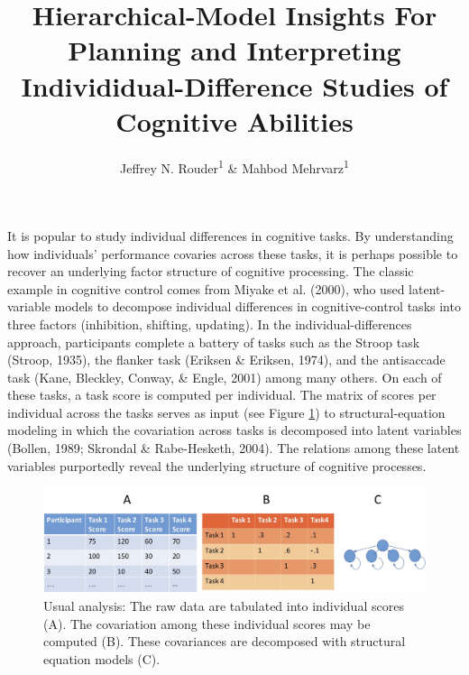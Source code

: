 \documentclass[
  ,man]{apa6}
\title{Hierarchical-Model Insights For Planning and Interpreting Individidual-Difference Studies of Cognitive Abilities}
\author{Jeffrey N. Rouder\textsuperscript{1} \& Mahbod Mehrvarz\textsuperscript{1}}
\date{}
\affiliation{\vspace{0.5cm}\textsuperscript{1} University of California, Irvine}
\begin{document}
\maketitle

It is popular to study individual differences in cognitive tasks. By understanding how individuals' performance covaries across these tasks, it is perhaps possible to recover an underlying factor structure of cognitive processing. The classic example in cognitive control comes from Miyake et al. (2000), who used latent-variable models to decompose individual differences in cognitive-control tasks into three factors (inhibition, shifting, updating). In the individual-differences approach, participants complete a battery of tasks such as the Stroop task (Stroop, 1935), the flanker task (Eriksen \& Eriksen, 1974), and the antisaccade task (Kane, Bleckley, Conway, \& Engle, 2001) among many others. On each of these tasks, a task score is computed per individual. The matrix of scores per individual across the tasks serves as input (see Figure \ref{fig:usual}) to structural-equation modeling in which the covariation across tasks is decomposed into latent variables (Bollen, 1989; Skrondal \& Rabe-Hesketh, 2004). The relations among these latent variables purportedly reveal the underlying structure of cognitive processes.

\begin{figure}
\includegraphics[width=5in]{dataAnalysis} \caption{Usual analysis: The raw data are tabulated into individual scores (A). The covariation among these individual scores may be computed (B).  These covariances are decomposed with structural equation models (C).}\label{fig:usual}
\end{figure}
\end{document}
